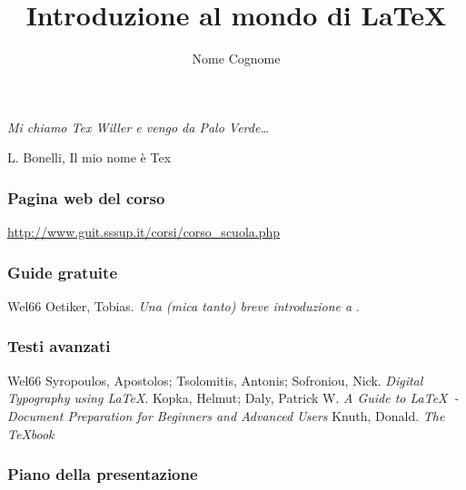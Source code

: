 \documentclass[svgnames,%
	ucs,%
	pdftex]{guitbeamer}
\title[Introduzione al mondo di \LaTeX]{Introduzione al mondo di \LaTeX}
\author[Nome Cognome]{Nome Cognome}
\date{} %
\begin{document}
\frame{\titlepage}
\begin{frame}
  \itshape
	Mi chiamo Tex Willer e vengo da Palo Verde\dots
	\begin{flushright}
		\upshape
		L. Bonelli, Il mio nome \`e Tex
	\end{flushright}
\end{frame}
\begin{frame}
  \frametitle{Pagina web del corso}
	\begin{center}
	  \large
		\url{http://www.guit.sssup.it/corsi/corso_scuola.php}
	\end{center}
\end{frame}
\begin{frame}
  \frametitle{Guide gratuite}
	\begin{thebibliography}{Wel66}
			Oetiker, Tobias.
			\newblock \textit{Una (mica tanto) breve introduzione a \LaTeXe}.
	\end{thebibliography}
\end{frame}
\begin{frame}
  \frametitle{Testi avanzati}
	\begin{thebibliography}{Wel66}
			Syropoulos, Apostolos; Tsolomitis, Antonis; Sofroniou, Nick.
			\newblock \textit{Digital Typography using \LaTeX}.
			Kopka, Helmut; Daly, Patrick W.
			\newblock \textit{A Guide to \LaTeX\ - Document Preparation for
			Beginners and Advanced Users}
	  \bigskip
			Knuth, Donald.
			\newblock \textit{The \TeX book}
	\end{thebibliography}
\end{frame}
\begin{frame}
  \frametitle{Piano della presentazione}
  \tableofcontents
\end{frame}
\end{document}
